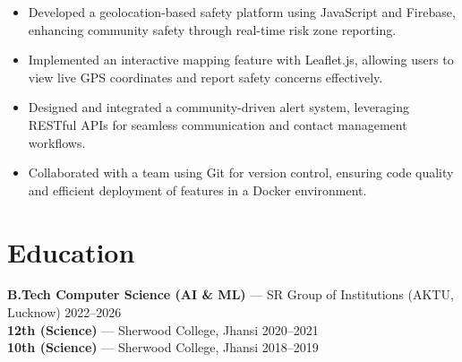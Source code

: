 \documentclass[10pt,a4paper]{article}
\begin{document}
\begin{itemize}[leftmargin=*,itemsep=0pt]
  \item {Developed a geolocation-based safety platform using JavaScript and Firebase, enhancing community safety through real-time risk zone reporting.}
  \item {Implemented an interactive mapping feature with Leaflet.js, allowing users to view live GPS coordinates and report safety concerns effectively.}
  \item {Designed and integrated a community-driven alert system, leveraging RESTful APIs for seamless communication and contact management workflows.}
  \item {Collaborated with a team using Git for version control, ensuring code quality and efficient deployment of features in a Docker environment.}
\end{itemize}
\vspace{2pt}




\section{Education}
\textbf{B.Tech Computer Science (AI \& ML)} — SR Group of Institutions (AKTU, Lucknow) \hfill 2022–2026 \\
\vspace{2pt}
\textbf{12th (Science)} — Sherwood College, Jhansi \hfill 2020–2021 \\
\vspace{2pt}
\textbf{10th (Science)} — Sherwood College, Jhansi \hfill 2018–2019 \\
\vspace{2pt}



\end{document}
